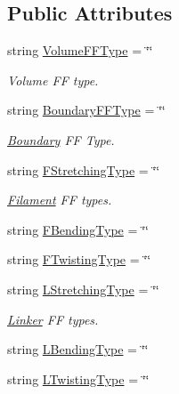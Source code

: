 \subsection*{Public Attributes}
\begin{DoxyCompactItemize}
\item 
string \hyperlink{structMechanicsFFType_a5f694c3765d3856e1987c22d167490a7}{Volume\+F\+F\+Type} = \char`\"{}\char`\"{}
\begin{DoxyCompactList}\small\item\em Volume F\+F type. \end{DoxyCompactList}\item 
string \hyperlink{structMechanicsFFType_ad83b593a03dacd9224f526da4714aa25}{Boundary\+F\+F\+Type} = \char`\"{}\char`\"{}
\begin{DoxyCompactList}\small\item\em \hyperlink{classBoundary}{Boundary} F\+F Type. \end{DoxyCompactList}\end{DoxyCompactItemize}
{\bf }\par
\begin{DoxyCompactItemize}
\item 
string \hyperlink{structMechanicsFFType_ad887670c75c1e05b77187cdae1c849fa}{F\+Stretching\+Type} = \char`\"{}\char`\"{}
\begin{DoxyCompactList}\small\item\em \hyperlink{classFilament}{Filament} F\+F types. \end{DoxyCompactList}\item 
string \hyperlink{structMechanicsFFType_acbd0076ef804005b56b6db07dce03589}{F\+Bending\+Type} = \char`\"{}\char`\"{}
\item 
string \hyperlink{structMechanicsFFType_a7cde64b003b7a90a9f3fa13b5dbe573f}{F\+Twisting\+Type} = \char`\"{}\char`\"{}
\end{DoxyCompactItemize}

{\bf }\par
\begin{DoxyCompactItemize}
\item 
string \hyperlink{structMechanicsFFType_a1e03399a615a236fcb90a356d274681c}{L\+Stretching\+Type} = \char`\"{}\char`\"{}
\begin{DoxyCompactList}\small\item\em \hyperlink{classLinker}{Linker} F\+F types. \end{DoxyCompactList}\item 
string \hyperlink{structMechanicsFFType_a14852de6199812e5e6c646f2a8479aac}{L\+Bending\+Type} = \char`\"{}\char`\"{}
\item 
string \hyperlink{structMechanicsFFType_a90c249f75ff2207d3ec927e1e8da57f1}{L\+Twisting\+Type} = \char`\"{}\char`\"{}
\end{DoxyCompactItemize}

